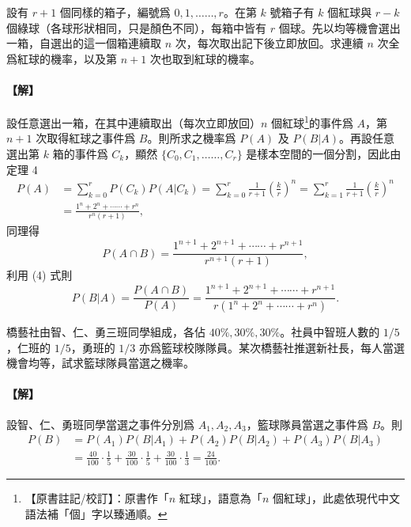 \medskip
\begin{example}\label{ex:b5s-4-9}
設有 $r+1$ 個同樣的箱子，編號爲 $0, 1, \dots\dots, r$。在第 $k$ 號箱子有 $k$ 個紅球與 $r-k$ 個綠球（各球形狀相同，只是顏色不同），每箱中皆有 $r$ 個球。先以均等機會選出一箱，自選出的這一個箱連續取 $n$ 次，每次取出記下後立即放回。求連續 $n$ 次全爲紅球的機率，以及第 $n+1$ 次也取到紅球的機率。
\end{example}
\paragraph{【解】}
設任意選出一箱，在其中連續取出（每次立即放回）$n$ 個紅球\label{note:b5s-ch4-ex9-ge}\footnote{【原書註記/校訂】：原書作「$n$ 紅球」，語意為「$n$ 個紅球」，此處依現代中文語法補「個」字以臻通順。}的事件爲 $A$，第 $n+1$ 次取得紅球之事件爲 $B$。則所求之機率爲 $P(A)$ 及 $P(B|A)$。再設任意選出第 $k$ 箱的事件爲 $C_k$，顯然 $\{C_0, C_1, \dots\dots, C_r\}$ 是樣本空間的一個分割，因此由定理 4
\begin{align*}
P(A) &= \sum_{k=0}^r P(C_k) P(A|C_k) = \sum_{k=0}^r \frac{1}{r+1} \left(\frac{k}{r}\right)^n = \sum_{k=1}^r \frac{1}{r+1} \left(\frac{k}{r}\right)^n \\
&= \frac{1^n + 2^n + \cdots\cdots + r^n}{r^n(r+1)},
\end{align*}
同理得
\[
P(A \cap B) = \frac{1^{n+1} + 2^{n+1} + \cdots\cdots + r^{n+1}}{r^{n+1}(r+1)},
\]
利用 (4) 式則
\[
P(B|A) = \frac{P(A \cap B)}{P(A)} = \frac{1^{n+1} + 2^{n+1} + \cdots\cdots + r^{n+1}}{r(1^n + 2^n + \cdots\cdots + r^n)}. \tag*{\#}
\]

\medskip
\begin{example}\label{ex:b5s-4-10}
橋藝社由智、仁、勇三班同學組成，各佔 $40\%, 30\%, 30\%$。社員中智班人數的 $1/5$，仁班的 $1/5$，勇班的 $1/3$ 亦爲籃球校隊隊員。某次橋藝社推選新社長，每人當選機會均等，試求籃球隊員當選之機率。
\end{example}
\paragraph{【解】}
設智、仁、勇班同學當選之事件分別爲 $A_1, A_2, A_3$，籃球隊員當選之事件爲 $B$。則
\begin{align*}
P(B) &= P(A_1) P(B|A_1) + P(A_2) P(B|A_2) + P(A_3) P(B|A_3) \\
&= \frac{40}{100} \cdot \frac{1}{5} + \frac{30}{100} \cdot \frac{1}{5} + \frac{30}{100} \cdot \frac{1}{3} = \frac{24}{100}. \tag*{\#}
\end{align*}

